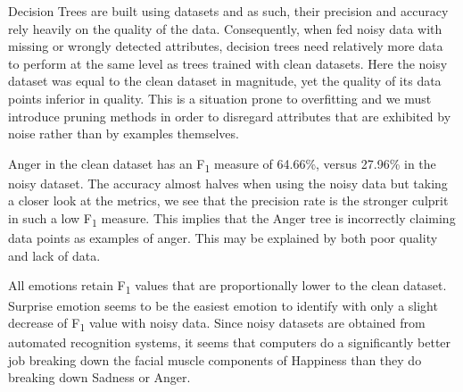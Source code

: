 Decision Trees are built using datasets and as such, their precision and accuracy rely heavily on the quality of the data.
Consequently, when fed noisy data with missing or wrongly detected attributes, decision trees need relatively more data to
perform at the same level as trees trained with clean datasets. Here the noisy dataset was equal to the clean dataset in magnitude, yet the quality of its data points
inferior in quality. This is a situation prone to overfitting and we must introduce pruning methods in order to disregard attributes
that are exhibited by noise rather than by examples themselves.

Anger in the clean dataset has an F\textsubscript{1} measure of 64.66\%, versus 27.96\% in the noisy dataset.
The accuracy almost halves when using the noisy data but taking a closer look at the metrics, we see that the precision
rate is the stronger culprit in such a low F\textsubscript{1} measure. This implies that the Anger tree is incorrectly claiming
data points as examples of anger. This may be explained by both poor quality and lack of data.

All emotions retain F\textsubscript{1} values that are proportionally lower to the clean dataset. 
Surprise emotion seems to be the easiest emotion to identify with only a slight decrease of F\textsubscript{1} value with noisy data.
Since noisy datasets are obtained from automated recognition systems, it seems that computers do a significantly better job
breaking down the facial muscle components of Happiness than they do breaking down Sadness or Anger. 
